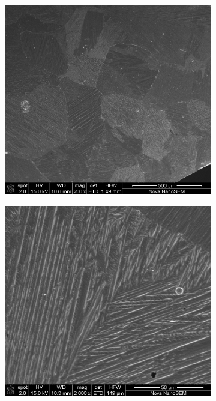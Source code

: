 \documentclass[a4paper,12pt,fleqn,twoside,openany]{book}
\begin{document}
  \begin{figure}%
    \centering
    
    ~ %
    \begin{subfigure}{0.4\textwidth}
        \includegraphics[width=\textwidth]{Img/Resultados/clavos/L1B1_016.jpg}
        \caption{}
        \label{fig:ExpRes}
    \end{subfigure}
    \begin{subfigure}{0.4\textwidth}
        \includegraphics[width=\textwidth]{Img/Resultados/clavos/L1B1_014.jpg}

\end{subfigure}
\end{figure}
\end{document}
